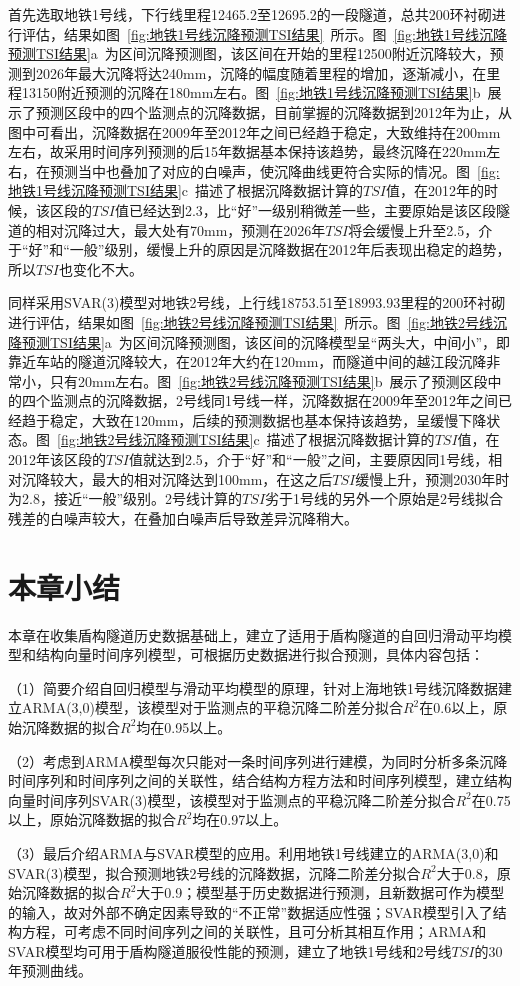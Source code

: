 首先选取地铁1号线，下行线里程12465.2至12695.2的一段隧道，总共200环衬砌进行评估，结果如图~\ref{fig:地铁1号线沉降预测TSI结果}~所示。图~\ref{fig:地铁1号线沉降预测TSI结果}a~为区间沉降预测图，该区间在开始的里程12500附近沉降较大，预测到2026年最大沉降将达240mm，沉降的幅度随着里程的增加，逐渐减小，在里程13150附近预测的沉降在180mm左右。图~\ref{fig:地铁1号线沉降预测TSI结果}b~展示了预测区段中的四个监测点的沉降数据，目前掌握的沉降数据到2012年为止，从图中可看出，沉降数据在2009年至2012年之间已经趋于稳定，大致维持在200mm左右，故采用时间序列预测的后15年数据基本保持该趋势，最终沉降在220mm左右，在预测当中也叠加了对应的白噪声，使沉降曲线更符合实际的情况。图~\ref{fig:地铁1号线沉降预测TSI结果}c~描述了根据沉降数据计算的$TSI$值，在2012年的时候，该区段的$TSI$值已经达到2.3，比“好”一级别稍微差一些，主要原始是该区段隧道的相对沉降过大，最大处有70mm，预测在2026年$TSI$将会缓慢上升至2.5，介于“好”和“一般”级别，缓慢上升的原因是沉降数据在2012年后表现出稳定的趋势，所以$TSI$也变化不大。

同样采用SVAR(3)模型对地铁2号线，上行线18753.51至18993.93里程的200环衬砌进行评估，结果如图~\ref{fig:地铁2号线沉降预测TSI结果}~所示。图~\ref{fig:地铁2号线沉降预测TSI结果}a~为区间沉降预测图，该区间的沉降模型呈“两头大，中间小”，即靠近车站的隧道沉降较大，在2012年大约在120mm，而隧道中间的越江段沉降非常小，只有20mm左右。图~\ref{fig:地铁2号线沉降预测TSI结果}b~展示了预测区段中的四个监测点的沉降数据，2号线同1号线一样，沉降数据在2009年至2012年之间已经趋于稳定，大致在120mm，后续的预测数据也基本保持该趋势，呈缓慢下降状态。图~\ref{fig:地铁2号线沉降预测TSI结果}c~描述了根据沉降数据计算的$TSI$值，在2012年该区段的$TSI$值就达到2.5，介于“好”和“一般”之间，主要原因同1号线，相对沉降较大，最大的相对沉降达到100mm，在这之后$TSI$缓慢上升，预测2030年时为2.8，接近“一般”级别。2号线计算的$TSI$劣于1号线的另外一个原始是2号线拟合残差的白噪声较大，在叠加白噪声后导致差异沉降稍大。


\section{本章小结}

本章在收集盾构隧道历史数据基础上，建立了适用于盾构隧道的自回归滑动平均模型和结构向量时间序列模型，可根据历史数据进行拟合预测，具体内容包括：

（1）简要介绍自回归模型与滑动平均模型的原理，针对上海地铁1号线沉降数据建立ARMA(3,0)模型，该模型对于监测点的平稳沉降二阶差分拟合$R^2$在0.6以上，原始沉降数据的拟合$R^2$均在0.95以上。

（2）考虑到ARMA模型每次只能对一条时间序列进行建模，为同时分析多条沉降时间序列和时间序列之间的关联性，结合结构方程方法和时间序列模型，建立结构向量时间序列SVAR(3)模型，该模型对于监测点的平稳沉降二阶差分拟合$R^2$在0.75以上，原始沉降数据的拟合$R^2$均在0.97以上。

（3）最后介绍ARMA与SVAR模型的应用。利用地铁1号线建立的ARMA(3,0)和SVAR(3)模型，拟合预测地铁2号线的沉降数据，沉降二阶差分拟合$R^2$大于0.8，原始沉降数据的拟合$R^2$大于0.9；模型基于历史数据进行预测，且新数据可作为模型的输入，故对外部不确定因素导致的“不正常”数据适应性强；SVAR模型引入了结构方程，可考虑不同时间序列之间的关联性，且可分析其相互作用；ARMA和SVAR模型均可用于盾构隧道服役性能的预测，建立了地铁1号线和2号线$TSI$的30年预测曲线。

